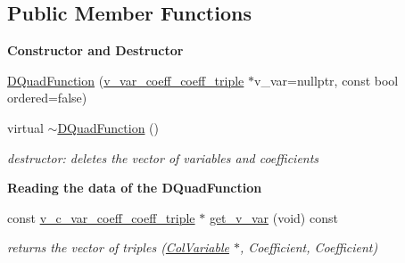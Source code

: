 \subsection*{Public Member Functions}
\begin{Indent}\textbf{ Constructor and Destructor}\par
\begin{DoxyCompactItemize}
\item 
\mbox{\hyperlink{class_s_m_spp__di__unipi__it_1_1_d_quad_function_a3843f68fee9919cf27f910700932fedd}{D\+Quad\+Function}} (\mbox{\hyperlink{class_s_m_spp__di__unipi__it_1_1_d_quad_function_adaced695e00a65836eb558a7bfbd85f4}{v\+\_\+var\+\_\+coeff\+\_\+coeff\+\_\+triple}} $\ast$v\+\_\+var=nullptr, const bool ordered=false)
\item 
\mbox{\label{class_s_m_spp__di__unipi__it_1_1_d_quad_function_a3f7ac72e96d5be57f7ecc5c9241e6c35}} 
virtual \mbox{\hyperlink{class_s_m_spp__di__unipi__it_1_1_d_quad_function_a3f7ac72e96d5be57f7ecc5c9241e6c35}{$\sim$\+D\+Quad\+Function}} ()
\begin{DoxyCompactList}\small\item\em destructor\+: deletes the vector of variables and coefficients \end{DoxyCompactList}\end{DoxyCompactItemize}
\end{Indent}
\begin{Indent}\textbf{ Reading the data of the D\+Quad\+Function}\par
\begin{DoxyCompactItemize}
\item 
\mbox{\label{class_s_m_spp__di__unipi__it_1_1_d_quad_function_ac72484ff9f1d681f776d5a8d4e97fe7a}} 
const \mbox{\hyperlink{class_s_m_spp__di__unipi__it_1_1_d_quad_function_adc080f133f994f0f0aa523cc52a0c368}{v\+\_\+c\+\_\+var\+\_\+coeff\+\_\+coeff\+\_\+triple}} $\ast$ \mbox{\hyperlink{class_s_m_spp__di__unipi__it_1_1_d_quad_function_ac72484ff9f1d681f776d5a8d4e97fe7a}{get\+\_\+v\+\_\+var}} (void) const
\begin{DoxyCompactList}\small\item\em returns the vector of triples (\mbox{\hyperlink{class_s_m_spp__di__unipi__it_1_1_col_variable}{Col\+Variable}} $\ast$, Coefficient, Coefficient) \end{DoxyCompactList}\end{DoxyCompactItemize}
\end{Indent}
